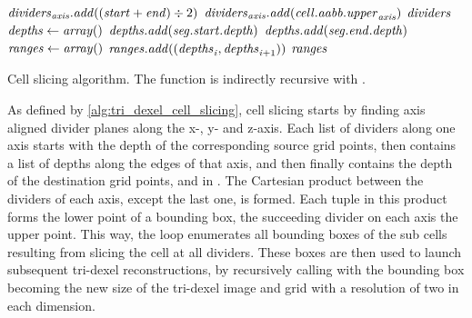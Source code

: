 \begin{algorithm}
\begin{algorithmic}[1]
				\State $\mathit{dividers}_{\mathit{axis}}.\mathit{add}((\mathit{start} + \mathit{end}) \div 2)$
				\State $\mathit{dividers}_{\mathit{axis}}.\mathit{add}(\mathit{cell}.\mathit{aabb}.\mathit{upper}_{\mathit{axis}})$
			\EndFor
			\State \Return $\mathit{dividers}$
		\EndFunction
		\\
			\State $\mathit{depths} \gets \mathit{array}()$
					$\mathit{depths}.\mathit{add}(\mathit{seg}.\mathit{start}.\mathit{depth})$
				\EndIf
					$\mathit{depths}.\mathit{add}(\mathit{seg}.\mathit{end}.\mathit{depth})$
				\EndIf
			\EndFor
			\State $\mathit{ranges} \gets \mathit{array}()$
				\State $\mathit{ranges}.\mathit{add}((\mathit{depths}_{\mathit{i}}, \mathit{depths}_{\mathit{i} + 1}))$
			\EndFor
			\State \Return $\mathit{ranges}$
		\EndFunction
	\end{algorithmic}
	\caption{
		Cell slicing algorithm.
		The  function is indirectly recursive with .
	}
	\label{alg:tri_dexel_cell_slicing}
\end{algorithm}

As defined by \cref{alg:tri_dexel_cell_slicing}, cell slicing starts by finding axis aligned divider planes along the x-, y- and z-axis.
Each list of dividers along one axis starts with the depth of the corresponding source grid points, then contains a list of depths along the edges of that axis, and then finally contains the depth of the destination grid points, \cf {} and  in .
The Cartesian product between the dividers of each axis, except the last one, is formed.
Each tuple in this product forms the lower point of a bounding box, the succeeding divider on each axis the upper point.
This way, the loop enumerates all bounding boxes of the sub cells resulting from slicing the cell at all dividers.
These boxes are then used to launch subsequent tri-dexel reconstructions, by recursively calling  with the bounding box becoming the new size of the tri-dexel image and grid with a resolution of two in each dimension.

